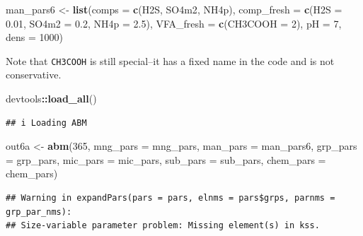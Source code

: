 \documentclass[
]{article}
\newenvironment{Shaded}{\begin{snugshade}}{\end{snugshade}}
\newcommand{\AttributeTok}[1]{\textcolor[rgb]{0.13,0.29,0.53}{#1}}
\newcommand{\DecValTok}[1]{\textcolor[rgb]{0.00,0.00,0.81}{#1}}
\newcommand{\FloatTok}[1]{\textcolor[rgb]{0.00,0.00,0.81}{#1}}
\newcommand{\FunctionTok}[1]{\textcolor[rgb]{0.13,0.29,0.53}{\textbf{#1}}}
\newcommand{\NormalTok}[1]{#1}
\newcommand{\OtherTok}[1]{\textcolor[rgb]{0.56,0.35,0.01}{#1}}
\newcommand{\SpecialCharTok}[1]{\textcolor[rgb]{0.81,0.36,0.00}{\textbf{#1}}}
\newcommand{\StringTok}[1]{\textcolor[rgb]{0.31,0.60,0.02}{#1}}
\begin{document}
\begin{Shaded}
\begin{Highlighting}[]
\NormalTok{man\_pars6 }\OtherTok{\textless{}{-}} \FunctionTok{list}\NormalTok{(}\AttributeTok{comps =} \FunctionTok{c}\NormalTok{(}\StringTok{\textquotesingle{}H2S\textquotesingle{}}\NormalTok{, }\StringTok{\textquotesingle{}SO4m2\textquotesingle{}}\NormalTok{, }\StringTok{\textquotesingle{}NH4p\textquotesingle{}}\NormalTok{),}
                 \AttributeTok{comp\_fresh =} \FunctionTok{c}\NormalTok{(}\AttributeTok{H2S =} \FloatTok{0.01}\NormalTok{, }\AttributeTok{SO4m2 =} \FloatTok{0.2}\NormalTok{, }\AttributeTok{NH4p =} \FloatTok{2.5}\NormalTok{), }
                 \AttributeTok{VFA\_fresh =} \FunctionTok{c}\NormalTok{(}\AttributeTok{CH3COOH =} \DecValTok{2}\NormalTok{),}
                 \AttributeTok{pH =} \DecValTok{7}\NormalTok{, }\AttributeTok{dens =} \DecValTok{1000}\NormalTok{)}
\end{Highlighting}
\end{Shaded}

Note that \texttt{CH3COOH} is still special--it has a fixed name in the
code and is not conservative.

\begin{Shaded}
\begin{Highlighting}[]
\NormalTok{devtools}\SpecialCharTok{::}\FunctionTok{load\_all}\NormalTok{()}
\end{Highlighting}
\end{Shaded}

\begin{verbatim}
## i Loading ABM
\end{verbatim}

\begin{Shaded}
\begin{Highlighting}[]
\NormalTok{out6a }\OtherTok{\textless{}{-}} \FunctionTok{abm}\NormalTok{(}\DecValTok{365}\NormalTok{,}
            \AttributeTok{mng\_pars =}\NormalTok{ mng\_pars,}
            \AttributeTok{man\_pars =}\NormalTok{ man\_pars6,}
            \AttributeTok{grp\_pars =}\NormalTok{ grp\_pars,}
            \AttributeTok{mic\_pars =}\NormalTok{ mic\_pars,}
            \AttributeTok{sub\_pars =}\NormalTok{ sub\_pars,}
            \AttributeTok{chem\_pars =}\NormalTok{ chem\_pars)}
\end{Highlighting}
\end{Shaded}

\begin{verbatim}
## Warning in expandPars(pars = pars, elnms = pars$grps, parnms = grp_par_nms):
## Size-variable parameter problem: Missing element(s) in kss.
\end{verbatim}
\end{document}
